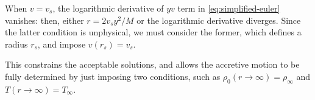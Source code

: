 \documentclass[main.tex]{subfiles}
\begin{document}
When \(v = v_s\), the logarithmic derivative of \(yv\) term in \eqref{eq:simplified-euler} vanishes: then, either \(r = 2 v_s y^2 /M\) or the logarithmic derivative diverges. Since the latter condition is unphysical, we must consider the former, which defines a radius \(r_s\), and impose \(v(r_s)=v_s\).

This constrains the acceptable solutions, and allows the accretive motion to be fully determined by just imposing two conditions, such as \(\rho_0 (r \rightarrow \infty) = \rho_\infty\) and \(T (r \rightarrow \infty) = T_\infty\).
\end{document}
